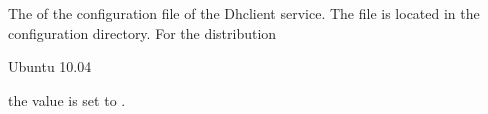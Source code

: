 
The  of the configuration file of the Dhclient service. 
The file is located in the configuration directory.
For the distribution
\begin{inparaitem}
\item[\TheDistribution{ubuntu}] Ubuntu 10.04
\end{inparaitem}
the value is set to .
